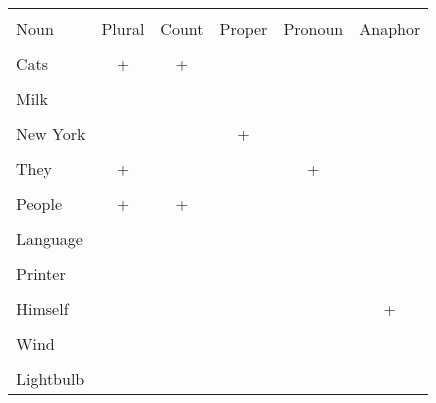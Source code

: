 \documentclass[11pt,notitlepage]{article}
\begin{document}
\begin{tabular}{|l|c|c|c|c|c|}
  \hline \\
  Noun & Plural & Count & Proper & Pronoun & Anaphor\\
  \hline \\
  Cats & + & + & & & \\
  \hline \\
  Milk & & & & & \\
  \hline \\
  New York & & & + & & \\
  \hline \\
  They & + & & & + & \\
  \hline \\
  People & + & + & & & \\
  \hline \\
  Language & & & & & \\
  \hline \\
  Printer & & & & & \\
  \hline \\
  Himself & & & & & + \\ 
  \hline \\
  Wind & & & & & \\
  \hline \\
  Lightbulb & & & & & \\
  \hline
\end{tabular}
\end{document}
